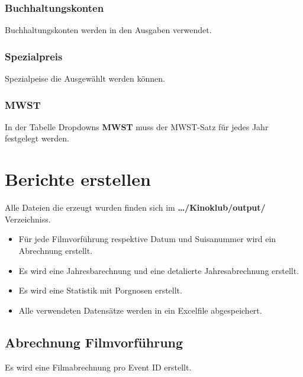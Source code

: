 \documentclass[
]{article}
\providecommand{\tightlist}{%
  \setlength{\itemsep}{0pt}\setlength{\parskip}{0pt}}
\begin{document}
\subsubsection{Buchhaltungskonten}\label{buchhaltungskonten}

Buchhaltungskonten werden in den Ausgaben verwendet.

\subsubsection{Spezialpreis}\label{spezialpreis}

Spezialpeise die Ausgewählt werden können.

\subsubsection{MWST}\label{mwst}

In der Tabelle Dropdowns \textbf{MWST} muss der MWST-Satz für jedes Jahr
festgelegt werden.

\section{Berichte erstellen}\label{berichte-erstellen}

Alle Dateien die erzeugt wurden finden sich im
\textbf{\ldots/Kinoklub/output/} Verzeichniss.

\begin{itemize}
\tightlist
\item
  Für jede Filmvorführung respektive Datum und Suisanummer wird ein
  Abrechnung erstellt.
\item
  Es wird eine Jahresbarechnung und eine detalierte Jahresabrechnung
  erstellt.
\item
  Es wird eine Statistik mit Porgnosen erstellt.
\item
  Alle verwendeten Datensätze werden in ein Excelfile abgespeichert.
\end{itemize}

\subsection{Abrechnung
Filmvorführung}\label{abrechnung-filmvorfuxfchrung}

Es wird eine Filmabrechnung pro Event ID erstellt.
\end{document}

